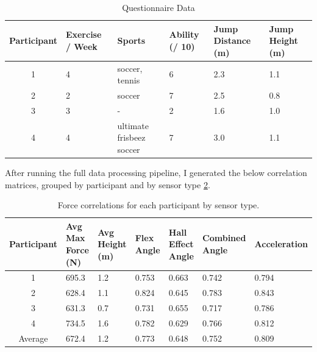 \documentclass[manuscript,screen,review]{acmart}
\begin{document}



\begin{table}[ht]
  \caption{Questionnaire Data}
  \label{tab:questionnaire}
  \begin{tabular}{clllll}
    \toprule
    Participant & Exercise / Week & Sports & Ability (/ 10) & Jump Distance (m) & Jump Height (m) \\
    \midrule
    1 & 4 & soccer, tennis & 6 & 2.3 & 1.1 \\
    2 & 2 & soccer & 7 & 2.5 & 0.8 \\
    3 & 3 & - & 2 & 1.6 & 1.0 \\
    4 & 4 & ultimate frisbeez soccer & 7 & 3.0 & 1.1 \\
  \bottomrule
\end{tabular}
\end{table}

After running the full data processing pipeline, I generated the below correlation matrices, grouped by participant and by sensor type \ref{tab:force_correlations}.


\begin{table}[ht]
  \caption{Force correlations for each participant by sensor type.}
  \label{tab:force_correlations}
  \begin{tabular}{cllllll}
    \toprule
    Participant & Avg Max Force (N) & Avg Height (m) & Flex Angle & Hall Effect Angle & Combined Angle & Acceleration \\
    \midrule
    1 & 695.3 & 1.2 & 0.753 & 0.663 & 0.742 & 0.794 \\
    2 & 628.4 & 1.1 & 0.824 & 0.645 & 0.783 & 0.843 \\
    3 & 631.3 & 0.7 & 0.731 & 0.655 & 0.717 & 0.786 \\
    4 & 734.5 & 1.6 & 0.782 & 0.629 & 0.766 & 0.812 \\
    Average & 672.4 & 1.2 & 0.773 & 0.648 & 0.752 & 0.809 \\
  \bottomrule
\end{tabular}
\end{table}
\end{document}
